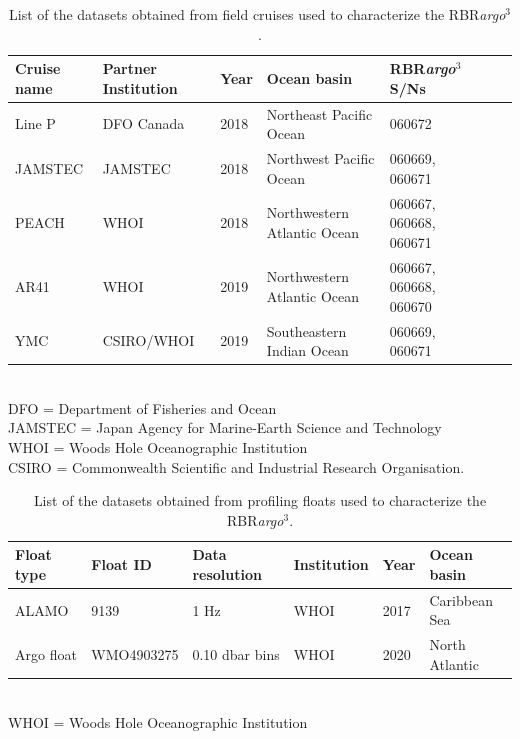 \documentclass{ametsocV6.1}
\begin{document}
\appendix[A]
\label{app: datasets}

\begin{table}[h!]
	\centering
	\caption{\label{tab: cruise_data}List of the datasets obtained from field cruises used to characterize the RBR\textit{argo}$^3$. }
\begin{tabular}{|l|l|l|l|l|l|l|}
	\hline
Cruise name 	& Partner Institution					& Year 	& Ocean basin           		& RBR\textit{argo}$^3$ S/Ns 										\\ \hline
Line P      			& DFO Canada 							& 2018 & Northeast Pacific Ocean     	& 060672                        						\\
JAMSTEC     	& JAMSTEC             						& 2018 & Northwest Pacific Ocean    	& 060669, 060671                				\\
PEACH       		& WHOI     									& 2018 & Northwestern Atlantic Ocean& 060667, 060668, 060671					\\
AR41        			& WHOI     									& 2019 & Northwestern Atlantic Ocean& 060667, 060668, 060670        			\\
YMC         		& CSIRO/WHOI               						& 2019 & Southeastern Indian Ocean           		&	060669, 060671								\\ \hline
\end{tabular}
\footnotesize
\raggedright
\\DFO = Department of Fisheries and Ocean\\
JAMSTEC = Japan Agency for Marine-Earth Science and Technology\\
WHOI = Woods Hole Oceanographic Institution\\
CSIRO = Commonwealth Scientific and Industrial Research Organisation.
\end{table}

\begin{table}[h!]
	\centering
	\caption{\label{tab: float_data}List of the datasets obtained from profiling floats used to characterize the RBR\textit{argo}$^3$. }
\begin{tabular}{|l|l|l|l|l|l|}
	\hline
Float type & Float ID & Data resolution & Institution					& Year & Ocean basin           \\ \hline
ALAMO & 9139 & 1 Hz & WHOI & 2017 & Caribbean Sea \\
Argo float & WMO4903275 & 0.10 dbar bins & WHOI & 2020 & North Atlantic \\ \hline
\end{tabular}
\footnotesize
\raggedright
\\WHOI = Woods Hole Oceanographic Institution\\
\end{table}
\end{document}
